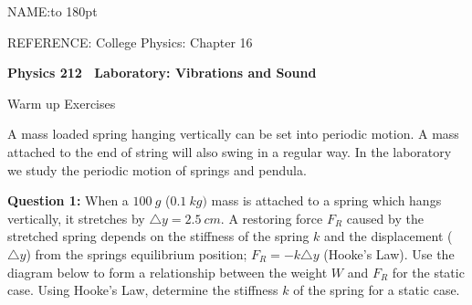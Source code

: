 \documentclass[14pt]{article}
\def \courseno {212}
\newcommand{\subheading}[1]{{\boldtenrm #1}}
\newcommand{\referencepages}[1]{\vskip -25pt{\eightrm REFERENCE: #1}}
\newcommand{\materials}[1]{\vskip -15pt{\eightrm MATERIALS: #1}}
\def \setheadline#1{\footline{}\headline={\hfill {\eightrm #1 p. \folio}}}
\begin{document}
\thispagestyle{plain} %
\baselineskip 14pt

\def \headline{\hfill {NAME:\hbox to 180pt{\hrulefill}}}
\def \footline={20230130}%
\def \setheadline#1{\footline{}\headline={\hfill {\eightrm #1 p. \folio}}}
\vskip 0pt  \headline

\referencepages{College Physics: Chapter 16}

\newcount \questionno
\newcount \sumquestions {}
\def \question#1{\advance\questionno by 1{\bf Question~\number\questionno:}{\global\advance\sumquestions by #1} }
\def \showsumquestions{\immediate \write0 {>>> Sum of questions >>> \number\sumquestions pts}}

\def \degc{$^oC$}

{\bf Physics \courseno~ Laboratory: Vibrations and Sound}

\subheading{Warm up Exercises~} 

A mass loaded spring hanging vertically can be set into periodic motion. A mass attached to the end of string will also swing in a regular way.  In the laboratory we study the periodic motion of springs and pendula.

{\bf Question 1:} When a $100~g$ ($0.1~kg)$ mass is attached to a spring which hangs vertically, it stretches by $\triangle y=2.5~cm$. A restoring force $F_R$ caused by the stretched spring depends on the stiffness of the spring $k$ and the displacement ($\triangle y$) from the springs equilibrium position; $F_R=-k\triangle y$ (Hooke's Law). Use the diagram below to form a relationship between the weight $W$ and $F_R$ for the static case. Using Hooke's Law, determine the stiffness $k$ of the spring for a static case.  %

\end{document}
